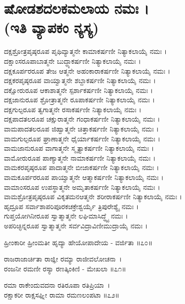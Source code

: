 \section{ಷೋಡಶದಲಕಮಲಾಯ ನಮಃ ।\\ (ಇತಿ ವ್ಯಾಪಕಂ ನ್ಯಸ್ಯ)}
ದಕ್ಷಶ್ರೋತ್ರಪೃಷ್ಠರೂಪ ಪೃಥಿವ್ಯಾತ್ಮನೇ ಕಾಮಾಕರ್ಷಣೀ ನಿತ್ಯಾಕಲಾಯೈ ನಮಃ ।\\
ದಕ್ಷಾಂಸರೂಪಾಬಾತ್ಮನೇ ಬುದ್ಧ್ಯಾಕರ್ಷಣೀ ನಿತ್ಯಾಕಲಾಯೈ ನಮಃ ।\\
ದಕ್ಷಕೂರ್ಪರರೂಪ ತೇಜ ಆತ್ಮನೇ ಅಹಂಕಾರಾಕರ್ಷಣೀ ನಿತ್ಯಾಕಲಾಯೈ ನಮಃ ।\\
ದಕ್ಷಕರಪೃಷ್ಠರೂಪ ವಾಯ್ವಾತ್ಮನೇ ಶಬ್ದಾಕರ್ಷಣೀ ನಿತ್ಯಾಕಲಾಯೈ ನಮಃ ।\\
ದಕ್ಷೋರುರೂಪ ಆಕಾಶಾತ್ಮನೇ ಸ್ಪರ್ಶಾಕರ್ಷಣೀ ನಿತ್ಯಾಕಲಾಯೈ ನಮಃ ।\\
ದಕ್ಷಜಾನುರೂಪ ಶ್ರೋತ್ರಾತ್ಮನೇ ರೂಪಾಕರ್ಷಣೀ ನಿತ್ಯಾಕಲಾಯೈ ನಮಃ ।\\
ದಕ್ಷಗುಲ್ಫರೂಪ ತ್ವಗಾತ್ಮನೇ ರಸಾಕರ್ಷಣೀ ನಿತ್ಯಾಕಲಾಯೈ ನಮಃ ।\\
ದಕ್ಷಪಾದತಲರೂಪ ಚಕ್ಷುರಾತ್ಮನೇ ಗಂಧಾಕರ್ಷಣೀ ನಿತ್ಯಾಕಲಾಯೈ ನಮಃ ।\\
ವಾಮಪಾದತಲರೂಪ ಜಿಹ್ವಾತ್ಮನೇ ಚಿತ್ತಾಕರ್ಷಣೀ ನಿತ್ಯಾಕಲಾಯೈ ನಮಃ ।\\
ವಾಮಗುಲ್ಫರೂಪ ಘ್ರಾಣಾತ್ಮನೇ ಧೈರ್ಯಾಕರ್ಷಣೀ ನಿತ್ಯಾಕಲಾಯೈ ನಮಃ ।\\
ವಾಮಜಾನುರೂಪ ವಾಗಾತ್ಮನೇ ಸ್ಮೃತ್ಯಾಕರ್ಷಣೀ ನಿತ್ಯಾಕಲಾಯೈ ನಮಃ ।\\
ವಾಮೋರುರೂಪ ಪಾಣ್ಯಾತ್ಮನೇ ನಾಮಾಕರ್ಷಣೀ ನಿತ್ಯಾಕಲಾಯೈ ನಮಃ ।\\
ವಾಮಕರಪೃಷ್ಠರೂಪ ಪಾದಾತ್ಮನೇ ಬೀಜಾಕರ್ಷಣೀ ನಿತ್ಯಾಕಲಾಯೈ ನಮಃ ।\\
ವಾಮಕೂರ್ಪರರೂಪ ಪಾಯ್ವಾತ್ಮನೇ ಆತ್ಮಾಕರ್ಷಣೀ ನಿತ್ಯಾಕಲಾಯೈ ನಮಃ ।\\
ವಾಮಾಂಸರೂಪ ಉಪಸ್ಥಾತ್ಮನೇ ಅಮೃತಾಕರ್ಷಣೀ ನಿತ್ಯಾಕಲಾಯೈ ನಮಃ ।\\
ವಾಮಶ್ರೋತ್ರಪೃಷ್ಠರೂಪ ವಿಕೃತಮನಆತ್ಮನೇ ಶರೀರಾಕರ್ಷಣೀ ನಿತ್ಯಾಕಲಾಯೈ ನಮಃ ।\\
ಹೃದ್ರೂಪ ಸರ್ವಾಶಾಪರಿಪೂರಕಚಕ್ರೇಶ್ವರ್ಯೈ ತ್ರಿಪುರೇಶ್ಯೈ ನಮಃ ।\\
ಗುಪ್ತಯೋಗಿನೀರೂಪ ಸ್ವಾತ್ಮಾತ್ಮನೇ ಲಘಿಮಾಸಿದ್ಧ್ಯೈ ನಮಃ ।\\
ಅಪರಿಚ್ಛಿನ್ನರೂಪ ಸ್ವಾತ್ಮಾತ್ಮನೇ ಸರ್ವವಿದ್ರಾವಿಣೀಮುದ್ರಾಯೈ ನಮಃ ।

ಹ್ರೀಂಕಾರೀ ಹ್ರೀಂಮತೀ ಹೃದ್ಯಾ ಹೇಯೋಪಾದೇಯ - ವರ್ಜಿತಾ ॥೭೦॥

ರಾಜರಾಜಾರ್ಚಿತಾ ರಾಜ್ಞೀ ರಮ್ಯಾ ರಾಜೀವಲೋಚನಾ~।\\
ರಂಜನೀ ರಮಣೀ ರಸ್ಯಾ ರಣತ್ಕಿಂಕಿಣಿ - ಮೇಖಲಾ ॥೭೧॥

ರಮಾ ರಾಕೇಂದುವದನಾ ರತಿರೂಪಾ ರತಿಪ್ರಿಯಾ~।\\
ರಕ್ಷಾಕರೀ ರಾಕ್ಷಸಘ್ನೀ ರಾಮಾ ರಮಣಲಂಪಟಾ ॥೭೨॥

